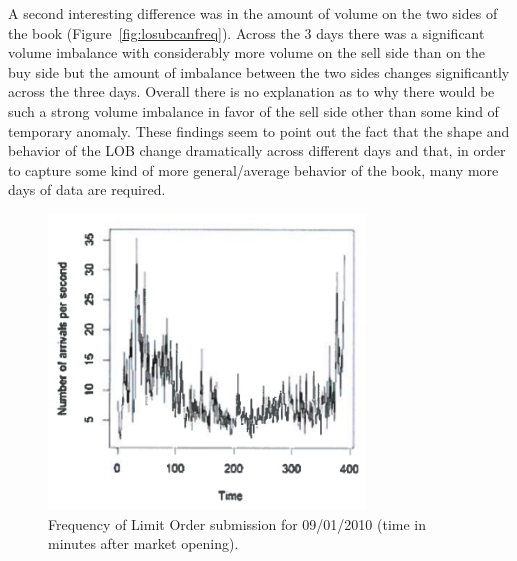 A second interesting difference was in the amount of volume on the two sides of the book (Figure~\ref{fig:losubcanfreq}). Across the 3 days there was a significant volume imbalance with considerably more volume on the sell side than on the buy side but the amount of imbalance between the two sides changes significantly across the three days. Overall there is no explanation as to why there would be such a strong volume imbalance in favor of the sell side other than some kind of temporary anomaly. These findings seem to point out the fact that the shape and behavior of the LOB change dramatically across different days and that, in order to capture some kind of more general/average behavior of the book, many more days of data are required. 
	\begin{figure}[!ht]
   	\centering
   	\includegraphics[width=0.75\textwidth]{chapters/chapter_el_exch/figures/freqsubmit.png} 
   	\caption{Frequency of Limit Order submission for 09/01/2010 (time in minutes after market opening). \label{fig:freqsubmit1}}
	\end{figure}
